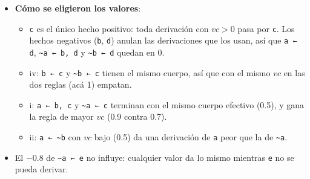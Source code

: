 \documentclass[11pt,a4paper]{article}
\newcommand{\nf}{\textasciitilde}
\begin{document}
\begin{extras}
\begin{itemize}
  \item \textbf{Cómo se eligieron los valores}:
  \begin{itemize}
    \item \texttt{c} es el único hecho positivo: toda derivación con $vc > 0$ pasa por \texttt{c}. Los hechos negativos (\texttt{b}, \texttt{d}) anulan las derivaciones que los usan, así que \texttt{a ← d}, \texttt{\nf a ← b, d} y \texttt{\nf b ← d} quedan en 0.
    \item iv: \texttt{b ← c} y \texttt{\nf b ← c} tienen el mismo cuerpo, así que con el mismo $vc$ en las dos reglas (acá 1) empatan.
    \item i: \texttt{a ← b, c} y \texttt{\nf a ← c} terminan con el mismo cuerpo efectivo (0.5), y gana la regla de mayor $vc$ (0.9 contra 0.7).
    \item ii: \texttt{a ← \nf b} con $vc$ bajo (0.5) da una derivación de \texttt{a} peor que la de \texttt{\nf a}.
  \end{itemize}
  \item El $-0.8$ de \texttt{\nf a ← e} no influye: cualquier valor da lo mismo mientras \texttt{e} no se pueda derivar.
\end{itemize}
\end{extras}
\end{document}
